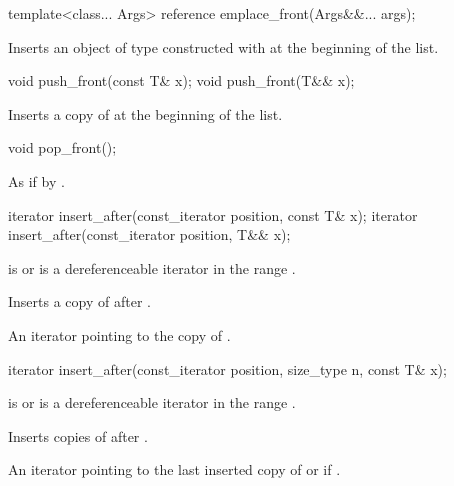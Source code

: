 %
\begin{itemdecl}
template<class... Args> reference emplace_front(Args&&... args);
\end{itemdecl}

\begin{itemdescr}
\pnum
\effects
Inserts an object of type  constructed with
 at the beginning of the list.
\end{itemdescr}

%
\begin{itemdecl}
void push_front(const T& x);
void push_front(T&& x);
\end{itemdecl}

\begin{itemdescr}
\pnum
\effects
Inserts a copy of  at the beginning of the list.
\end{itemdescr}


%
\begin{itemdecl}
void pop_front();
\end{itemdecl}

\begin{itemdescr}
\pnum
\effects
As if by .
\end{itemdescr}

%
\begin{itemdecl}
iterator insert_after(const_iterator position, const T& x);
iterator insert_after(const_iterator position, T&& x);
\end{itemdecl}

\begin{itemdescr}
\pnum
\expects
{} is  or is a dereferenceable
iterator in the range .

\pnum
\effects
Inserts a copy of  after .

\pnum
\returns
An iterator pointing to the copy of .
\end{itemdescr}

%
\begin{itemdecl}
iterator insert_after(const_iterator position, size_type n, const T& x);
\end{itemdecl}

\begin{itemdescr}
\pnum
\expects
{} is  or is a dereferenceable
iterator in the range .

\pnum
\effects
Inserts  copies of  after .

\pnum
\returns
An iterator pointing to the last inserted copy of  or  if .
\end{itemdescr}

